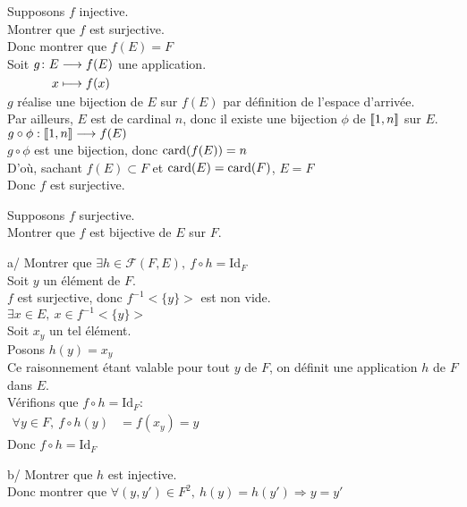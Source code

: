 \documentclass[12pt,twoside,a4paper]{article}
\begin{document}
	\begin{preuve}
		\begin{liste}
			\item[\cercle1]Supposons $f$ injective.\\
				Montrer que $f$ est surjective.\\
				Donc montrer que $f(E)=F$\\
				Soit $\begin{aligned}[t]g\colon E&\longrightarrow f(E) \\x&\longmapsto f(x)\end{aligned}$ une application.\\
				$g$ r\'ealise une bijection de $E$ sur $f(E)$ par d\'efinition de l'espace d'arriv\'ee.\\
				Par ailleurs, $E$ est de cardinal $n$, donc il existe une bijection $\phi$ de $[\![ 1,n]\!]$ sur $E$.\\
				$g\circ \phi:[\![ 1,n]\!]\longrightarrow f(E)$\\
				$g\circ\phi$ est une bijection, donc $\text{card}(f(E))=n$\\
				D'o\`u, sachant $f(E)\subset F$ et $\text{card}(E)=\text{card}(F)$, $E=F$\\
				Donc $f$ est surjective.
			\item[\cercle2]Supposons $f$ surjective.\\
				Montrer que $f$ est bijective de $E$ sur $F$.
				\begin{liste}
					\item[a/] Montrer que $\exists h\in\mathcal{F}(F,E),\ f\circ h=\text{Id}_F$\\
						Soit $y$ un \'el\'ement de $F$.\\
						$f$ est surjective, donc $f^{-1}<\{y\}>$ est non vide.\\
						$\exists x\in E,\ x\in f^{-1}<\{y\}>$\\
						Soit $x_y$ un tel \'el\'ement.\\
						Posons $h(y)=x_y$\\
						Ce raisonnement \'etant valable pour tout $y$ de $F$, on d\'efinit une application $h$ de $F$ dans $E$.\\
						V\'erifions que $f\circ h=\text{Id}_F$:\\
						$\begin{aligned}
						\forall y\in F,\ f\circ h(y)&=f(x_y)=y
						\end{aligned}$\\
						Donc $f\circ h=\text{Id}_F$
					\item[b/] Montrer que $h$ est injective.\\
						Donc montrer que $\forall (y,y')\in F^{2},\ h(y)=h(y')\Rightarrow y=y'$\\

\end{liste}
\end{liste}
\end{preuve}
\end{document}

